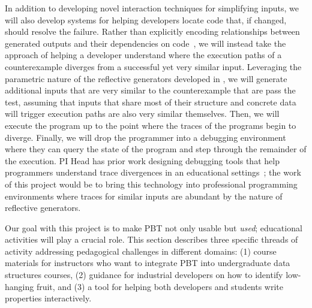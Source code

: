 


In addition to developing novel interaction techniques for simplifying inputs,
we will also develop systems for helping developers locate code that, if
changed, should resolve the failure. Rather than explicitly encoding
relationships between generated outputs and their dependencies on
code~\cite{ref:ko2009finding}, we will instead take the approach of helping a
developer understand where the execution paths of a counterexample diverges from
a successful yet very similar input. Leveraging the parametric nature of the
reflective generators developed in , we will generate
additional inputs that are very similar to the counterexample that are pass the
test, assuming that inputs that share most of their structure and concrete data
will trigger execution paths are also very similar themselves. Then, we will
execute the program up to the point where the traces of the programs begin to
diverge. Finally, we will drop the programmer into a debugging environment where
they can query the state of the program and step through the remainder of the
execution. PI Head has prior work designing debugging tools that help
programmers understand trace divergences in an educational
settings~\cite{ref:suzuki2017tracediff}; the work of this project would be to
bring this technology into professional programming environments where traces
for similar inputs are abundant by the nature of reflective generators.


Our goal with this project is to make PBT not only usable but {\em
  used}; educational activities will play a crucial role.  This
section describes three specific threads of activity addressing pedagogical
challenges in different domains:
(1) course materials for instructors who want to integrate PBT into
undergraduate data structures courses,
%
(2) guidance for
industrial developers on how to identify low-hanging fruit, and
%
(3) a
tool for helping both developers and students write properties
interactively.

